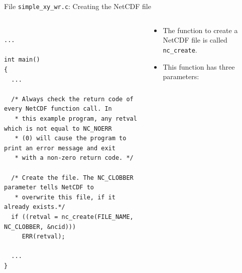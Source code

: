 \documentclass[compress,11pt,xcolor=svgnames,aspectratio=169]{beamer}
\begin{document}
\begin{frame}[fragile]{File \texttt{simple\_xy\_wr.c}: Creating the NetCDF file}

\begin{columns}

\begin{column}{0.5\textwidth}

{\tiny

\begin{verbatim}

...

int main()
{
  ...

  /* Always check the return code of every NetCDF function call. In
   * this example program, any retval which is not equal to NC_NOERR
   * (0) will cause the program to print an error message and exit
   * with a non-zero return code. */

  /* Create the file. The NC_CLOBBER parameter tells NetCDF to
   * overwrite this file, if it already exists.*/
  if ((retval = nc_create(FILE_NAME, NC_CLOBBER, &ncid)))
     ERR(retval);

  ...
}

\end{verbatim}

}

\end{column}

\begin{column}{0.5\textwidth}

{\footnotesize

\begin{itemize}
\setlength\itemsep{0.5cm}

\item The function to create a NetCDF file is called \verb|nc_create|.

\item This function has three parameters:


\end{itemize}

}

\end{column}

\end{columns}

\end{frame}
\end{document}
